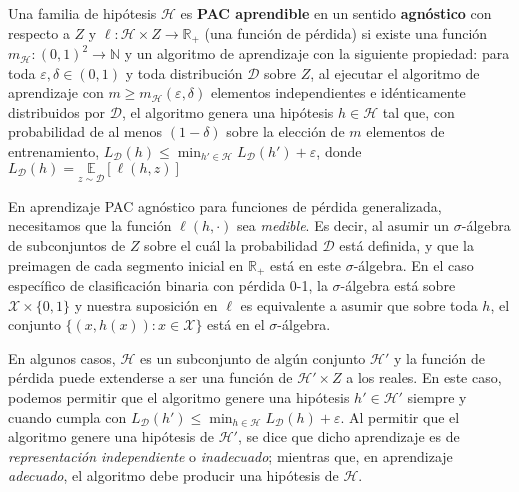 \documentclass[8pt,a4paper]{extarticle}
\begin{document}
\begin{multicols}{3}
\begin{boxdef}
	Una familia de hipótesis $\mathcal{H}$ es \textbf{PAC aprendible} en un sentido \textbf{agnóstico} con respecto a $Z$ y $\ell: \mathcal{H}\times Z \to \mathbb{R}_{+}$ (una función de pérdida) si existe una función $m_{\mathcal{H}} : (0,1)^2 \to \mathbb{N}$ y un algoritmo de aprendizaje con la siguiente propiedad: \textcolor{dred}{para toda $\varepsilon, \delta \in (0,1)$ y toda distribución $\mathcal{D}$ sobre $Z$, al ejecutar el algoritmo de aprendizaje con $m \ge m_{\mathcal{H}} (\varepsilon, \delta)$ elementos independientes e idénticamente distribuidos por $\mathcal{D}$, el algoritmo genera una hipótesis $h \in \mathcal{H}$ tal que, con probabilidad de al menos  $(1 - \delta)$ sobre la elección de $m$ elementos de entrenamiento, $L_{\mathcal{D}} (h) \le \min_{h' \in \mathcal{H}} L_{\mathcal{D}} (h') + \varepsilon$, donde $L_{\mathcal{D}} (h) = \underset{z\sim \mathcal{D}}{\mathbb{E}} [\ell (h,z)]$}
\end{boxdef}

\begin{boxrmk}[]
	En aprendizaje PAC agnóstico para funciones de pérdida generalizada, necesitamos que la función $ \ell (h,\cdot)$ sea \emph{medible}. Es decir, al asumir un $\sigma$-álgebra de subconjuntos de  $Z$ sobre el cuál la probabilidad  $\mathcal{D}$ está definida, y que la preimagen de cada segmento inicial en $\mathbb{R}_{+}$ está en este $\sigma$-álgebra. \textcolor{dgray}{En el caso específico de clasificación binaria con pérdida 0-1, la  $\sigma$-álgebra está sobre  $ \mathcal{X} \times \{0,1\} $ y nuestra suposición en $ \ell$ es equivalente a asumir que sobre toda $h$, el conjunto  $ \{(x, h(x)) : x \in \mathcal{X}\} $ está en el $\sigma$-álgebra.}
\end{boxrmk}

\begin{boxrmk}
	En algunos casos, $\mathcal{H}$ es un subconjunto de algún conjunto $\mathcal{H}'$ y la función de pérdida puede extenderse a ser una función de $\mathcal{H}' \times Z$ a los reales. En este caso, podemos permitir que el algoritmo genere una hipótesis $h' \in \mathcal{H}'$ siempre y cuando cumpla con $L_{\mathcal{D}} (h') \le \min_{h \in \mathcal{H}} L_{\mathcal{D}} (h) + \varepsilon$. Al permitir que el algoritmo genere una hipótesis de $\mathcal{H}'$, se dice que dicho aprendizaje es de \emph{representación independiente} o \emph{inadecuado}; mientras que, en aprendizaje \emph{adecuado}, el algoritmo debe producir una hipótesis de $\mathcal{H}$.
\end{boxrmk}


\end{multicols}
\end{document}
